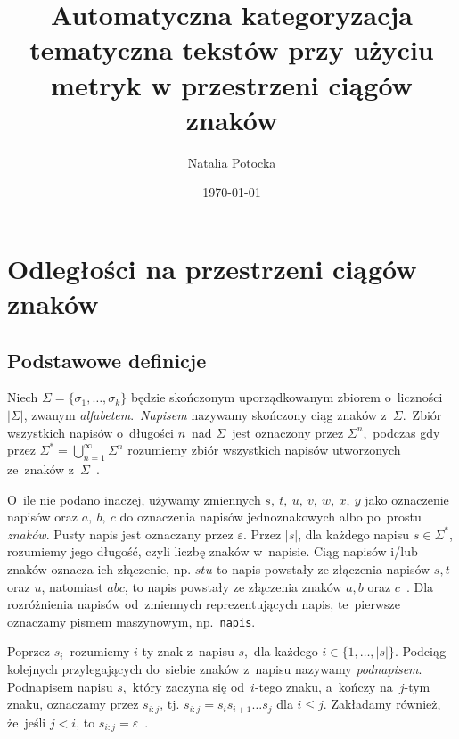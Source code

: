 \documentclass{praca1}
\author{Natalia Potocka}
\title{Automatyczna kategoryzacja tematyczna tekstów przy użyciu metryk w przestrzeni ciągów znaków}
\date{\today}
\begin{document}
%
%
%

\chapter{Odległości na przestrzeni ciągów znaków}
\label{metryki-na-przestrzeni-ciagow-znakow}


\section{Podstawowe definicje}


\begin{definition}
Niech  $\Sigma = \{\sigma_1, \ldots, \sigma_k\}$ będzie skończonym uporządkowanym zbiorem o~liczności $|\Sigma|$, zwanym \emph{alfabetem}.~\emph{Napisem} nazywamy skończony ciąg znaków z~$\Sigma$.~Zbiór wszystkich napisów o~długości $n$~nad $\Sigma$~jest oznaczony przez $\Sigma^n$,~podczas gdy przez $\Sigma^* = \bigcup_{n=1}^{\infty}\Sigma^n$ rozumiemy zbiór wszystkich napisów utworzonych ze~znaków z~$\Sigma$~\cite{Boytsov2011:indexingmethods}.
\end{definition}

O~ile nie podano inaczej, używamy zmiennych $s,\ t,\ u,\ v,\ w,\ x,\ y$ jako oznaczenie napisów oraz $a,\ b,\ c$ do oznaczenia napisów jednoznakowych albo po~prostu \emph{znaków}. Pusty napis jest oznaczany przez $\varepsilon$. Przez $|s|$, dla każdego napisu $s \in \Sigma^*$, rozumiemy jego długość, czyli liczbę znaków w~napisie. Ciąg napisów i/lub znaków oznacza ich złączenie, np. $stu$ to napis powstały ze złączenia napisów $s, t$ oraz $u$, natomiast $abc$, to napis powstały ze złączenia znaków $a, b$ oraz $c$~\cite{Boytsov2011:indexingmethods}. Dla rozróżnienia napisów od~zmiennych reprezentujących napis, te~pierwsze oznaczamy pismem maszynowym, np.~\verb|napis|.

Poprzez $s_i$~rozumiemy $i$-ty znak z~napisu $s$,~dla każdego $i \in \{1,\ldots,|s|\}$. Podciąg kolejnych przylegających do~siebie znaków z~napisu nazywamy \emph{podnapisem}. Podnapisem napisu $s$,~który zaczyna się od~$i$-tego znaku, a~kończy na~$j$-tym znaku, oznaczamy przez $s_{i:j}$, tj. $s_{i:j} = s_is_{i+1}\ldots s_j$ dla $i \leq j$. Zakładamy również, że~jeśli $j < i$, to $s_{i:j} = \varepsilon$~\cite{Boytsov2011:indexingmethods,Loo2014:stringdist}.
\end{document}
